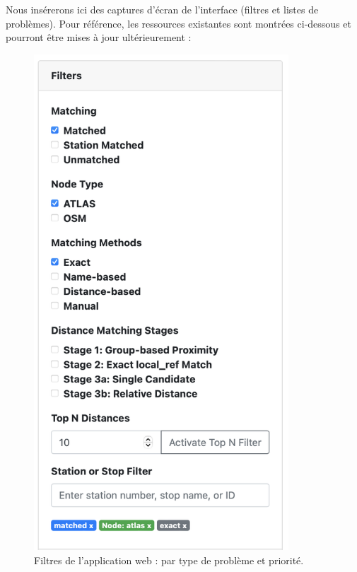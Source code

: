 \noindent Nous insérerons ici des captures d'écran de l'interface (filtres et listes de problèmes). Pour référence, les ressources existantes sont montrées ci-dessous et pourront être mises à jour ultérieurement :

\begin{figure}[h]
  \centering
  \includegraphics[width=0.85\textwidth]{../figures/webapp/filters.png}
  \caption{Filtres de l'application web : par type de problème et priorité.}
\end{figure}


